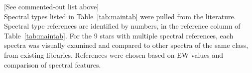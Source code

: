 \fi

[See commented-out list above]\\



Spectral types listed in Table~\ref{tab:maintab} were pulled from the literature.  
Spectral type references are identified by numbers, in the reference column of 
Table~\ref{tab:maintab}.  For the 9 stars with multiple spectral references, each 
spectra was visually examined and compared to other spectra of the same class, 
from existing libraries.  References were chosen based on EW values and comparison of 
spectral features.




\\
\\
\\
\\



